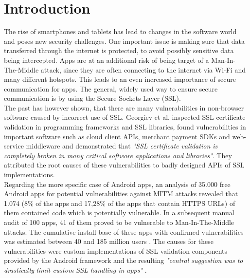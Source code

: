 \documentclass[draft,final]{vutinfth} %
\begin{document}

\tableofcontents* %

\mainmatter

\chapter{Introduction}

The rise of smartphones and tablets has lead to changes in the software world and poses new security challenges. One important issue is making sure that data transferred through the internet is protected, to avoid possibly sensitive data being intercepted. Apps are at an additional risk of being target of a Man-In-The-Middle attack, since they are often connecting to the internet via Wi-Fi and many different hotspots. This leads to an even increased importance of secure communication for apps. The general, widely used way to ensure secure communication is by using the Secure Sockets Layer (SSL).\\
The past has however shown, that there are many vulnerabilities in non-browser software caused by incorrect use of SSL. Georgiev et al. \cite{Georgiev} inspected SSL certificate validation in programming frameworks and SSL libraries, found vulnerabilities in important software such as cloud client APIs, merchant payment SDKs and web-service middleware and demonstrated that \textit{"SSL certificate validation is completely broken in many critical software applications and libraries"}. They attributed the root causes of these vulnerabilities to badly designed APIs of SSL implementations. \\
Regarding the more specific case of Android apps, an analysis of 35.000 free Android apps  for potential vulnerabilities against MITM attacks \cite{Fahl2012} revealed that 1.074 (8\% of the apps and 17,28\% of the apps that contain HTTPS URLs) of them contained code which is potentially vulnerable. In a subsequent manual audit of 100 apps, 41 of them proved to be vulnerable to Man-In-The-Middle attacks. The cumulative install base of these apps with confirmed vulnerabilities was estimated between 40 and 185 million users \cite{Fahl2013}. The causes for these vulnerabilities were custom implementations of SSL validation components provided by the Android framework and the resulting \textit{"central suggestion was to drastically limit custom SSL handling in apps"} \cite{Fahl2013}. \\
\end{document}
